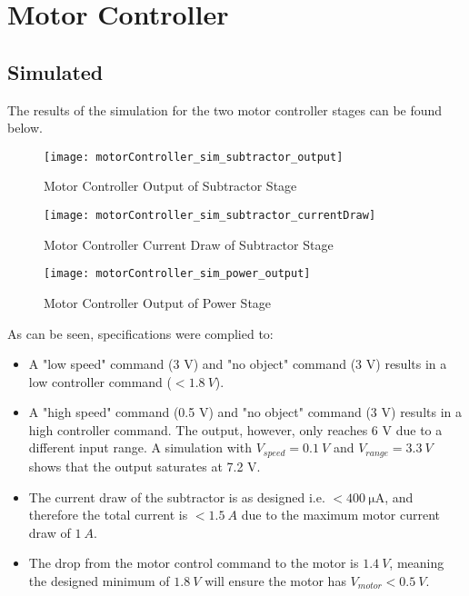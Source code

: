 \graphicspath{{content/3_results/figures}}
\section{Motor Controller}

\subsection{Simulated}

The results of the simulation for the two motor controller stages can be found below.

\begin{figure}[!htb]
  \centering
  \texttt{[image: motorController\_sim\_subtractor\_output]}
  \caption{Motor Controller Output of Subtractor Stage}
  \label{fig:motorController_sim_subtractor_output}
\end{figure}

\begin{figure}[!htb]
  \centering
  \texttt{[image: motorController\_sim\_subtractor\_currentDraw]}
  \caption{Motor Controller Current Draw of Subtractor Stage}
  \label{fig:motorController_sim_subtractor_currentDraw}
\end{figure}

\begin{figure}[!htb]
    \centering
    \texttt{[image: motorController\_sim\_power\_output]}
    \caption{Motor Controller Output of Power Stage}
    \label{fig:motorController_sim_power_output}
  \end{figure}

As can be seen, specifications were complied to:
\begin{itemize}
    \item A "low speed" command (3 V) and "no object" command (3 V) results in a low controller command ($< \SI{1.8}{V}$).
    \item A "high speed" command (0.5 V) and "no object" command (3 V) results in a high controller command. The output, however, only reaches 6 V
          due to a different input range. A simulation with $V_{speed} = \SI{0.1}{V}$ and $V_{range} = \SI{3.3}{V}$ shows that the output saturates at 7.2 V.
    \item The current draw of the subtractor is as designed i.e. $< \SI{400}{\micro\ampere}$, and therefore the total current is $< \SI{1.5}{A}$ due to the
          maximum motor current draw of $\SI{1}{A}$.
    \item The drop from the motor control command to the motor is $\SI{1.4}{V}$, meaning the designed minimum of $\SI{1.8}{V}$ will ensure the motor
          has $V_{motor} < \SI{0.5}{V}$.
\end{itemize}

